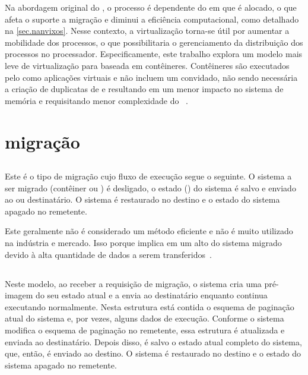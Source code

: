 Na abordagem original do \nanvix, o processo é dependente do \cluster em que é alocado, o que afeta o suporte a migração e diminui a eficiência computacional, como detalhado na \autoref{sec.nanvixos}. Nesse contexto, a virtualização torna-se útil por aumentar a mobilidade dos processos, o que possibilitaria o gerenciamento da distribuição dos processos no processador. Especificamente, este trabalho explora um modelo mais leve de virtualização para \lws baseada em contêineres. Contêineres são executados pelo \os como aplicações virtuais e não incluem um \os convidado, não sendo necessária a criação de duplicatas de \sos e resultando em um menor impacto no sistema de memória e requisitando menor complexidade do \hardware~\cite{thalheim2018cntr, sharma2016containers, zhang2018comparative}.


\section{migração}


\subsection{\Coldmigration}
Este é o tipo de migração cujo fluxo de execução segue o seguinte. O sistema a ser migrado (contêiner ou \vm) é desligado, o estado (\checkpoint) do sistema é salvo e enviado ao \so ou \vm destinatário. O sistema é restaurado no destino e o estado do sistema apagado no remetente.

Este geralmente não é considerado um método eficiente e não é muito utilizado na indústria e mercado. Isso porque implica em um alto \downtime do sistema migrado devido à alta quantidade de dados a serem transferidos~\cite{singh2022predictive}.

\subsection{\Precopymigration}
Neste modelo, ao receber a requisição de migração, o sistema cria uma pré-imagem do seu estado atual e a envia ao destinatário enquanto continua executando normalmente. Nesta estrutura está contida o esquema de paginação atual do sistema e, por vezes, alguns dados de execução. Conforme o sistema modifica o esquema de paginação no remetente, essa estrutura é atualizada e enviada ao destinatário. Depois disso, é salvo o estado atual completo do sistema, que, então, é enviado ao destino. O sistema é restaurado no destino e o estado do sistema apagado no remetente. 

